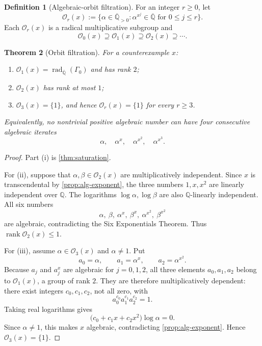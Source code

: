 \documentclass[11pt]{article}
\newtheorem{theorem}{Theorem}[section]
\theoremstyle{definition}
\newtheorem{definition}[theorem]{Definition}
\newcommand{\Q}{\mathbb{Q}}
\newcommand{\Qbar}{\overline{\mathbb{Q}}}
\newcommand{\rank}{\operatorname{rank}}
\newcommand{\rad}{\operatorname{rad}}
\newcommand{\Gammao}{\Gamma_0}
\newcommand{\Orb}{\mathcal{O}}
\begin{document}
\begin{definition}[Algebraic-orbit filtration]
For an integer $r\geq0$, let
\[
 \Orb_r(x):=
 \bigl\{\alpha\in\Qbar_{>0}:
        \alpha^{x^j}\in\Qbar\text{ for }0\leq j\leq r\bigr\}.
\]
Each $\Orb_r(x)$ is a radical multiplicative subgroup and
\[
 \Orb_0(x)\supseteq\Orb_1(x)\supseteq\Orb_2(x)\supseteq\cdots.
\]
\end{definition}

\begin{theorem}[Orbit filtration]
\label{thm:orbit-filtration}
For a counterexample $x$:
\begin{enumerate}[label=\textup{(\roman*)}]
\item $\Orb_1(x)=\rad_{\Qbar}(\Gammao)$ and has rank $2$;
\item $\Orb_2(x)$ has rank at most $1$;
\item $\Orb_3(x)=\{1\}$, and hence $\Orb_r(x)=\{1\}$ for every $r\geq3$.
\end{enumerate}
Equivalently, no nontrivial positive algebraic number can have four
consecutive algebraic iterates
\[
       \alpha,\quad \alpha^x,\quad
       \alpha^{x^2},\quad \alpha^{x^3}.
\]
\end{theorem}

\begin{proof}
Part (i) is \cref{thm:saturation}.

For (ii), suppose that $\alpha,\beta\in\Orb_2(x)$ are multiplicatively
independent.  Since $x$ is transcendental by \cref{prop:alg-exponent}, the
three numbers $1,x,x^2$ are linearly independent over $\Q$.  The logarithms
$\log\alpha,\log\beta$ are also $\Q$-linearly independent.  All six numbers
\[
 \alpha,\ \beta,\ \alpha^x,\ \beta^x,
 \ \alpha^{x^2},\ \beta^{x^2}
\]
are algebraic, contradicting the Six Exponentials Theorem.  Thus
$\rank\Orb_2(x)\leq1$.

For (iii), assume $\alpha\in\Orb_3(x)$ and $\alpha\neq1$.  Put
\[
 a_0=\alpha,
 \qquad a_1=\alpha^x,
 \qquad a_2=\alpha^{x^2}.
\]
Because $a_j$ and $a_j^x$ are algebraic for $j=0,1,2$, all three elements
$a_0,a_1,a_2$ belong to $\Orb_1(x)$, a group of rank $2$.  They are therefore
multiplicatively dependent: there exist integers $c_0,c_1,c_2$, not all zero,
with
\[
       a_0^{c_0}a_1^{c_1}a_2^{c_2}=1.
\]
Taking real logarithms gives
\[
       \bigl(c_0+c_1x+c_2x^2\bigr)\log\alpha=0.
\]
Since $\alpha\neq1$, this makes $x$ algebraic, contradicting
\cref{prop:alg-exponent}.  Hence $\Orb_3(x)=\{1\}$.
\end{proof}
\end{document}

